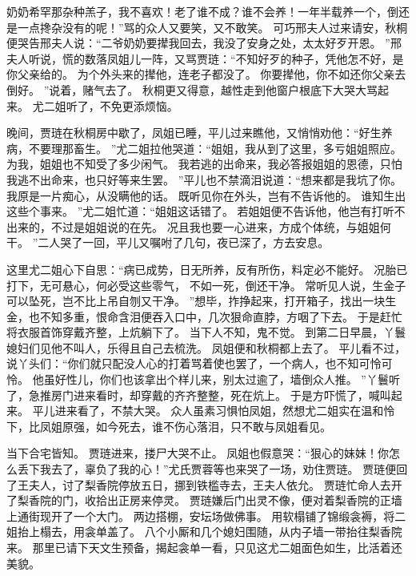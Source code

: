 奶奶希罕那杂种羔子，我不喜欢！老了谁不成？谁不会养！一年半载养一个，倒还是一点搀杂没有的呢！”骂的众人又要笑，又不敢笑。
可巧邢夫人过来请安，秋桐便哭告邢夫人说：“二爷奶奶要撵我回去，我没了安身之处，太太好歹开恩。
”邢夫人听说，慌的数落凤姐儿一阵，又骂贾琏：“不知好歹的种子，凭他怎不好，是你父亲给的。
为个外头来的撵他，连老子都没了。
你要撵他，你不如还你父亲去倒好。
”说着，赌气去了。
秋桐更又得意，越性走到他窗户根底下大哭大骂起来。
尤二姐听了，不免更添烦恼。
\par
晚间，贾琏在秋桐房中歇了，凤姐已睡，平儿过来瞧他，又悄悄劝他：“好生养病，不要理那畜生。
”尤二姐拉他哭道：“姐姐，我从到了这里，多亏姐姐照应。
为我，姐姐也不知受了多少闲气。
我若逃的出命来，我必答报姐姐的恩德，只怕我逃不出命来，也只好等来生罢。
”平儿也不禁滴泪说道：“想来都是我坑了你。
我原是一片痴心，从没瞒他的话。
既听见你在外头，岂有不告诉他的。
谁知生出这些个事来。
”尤二姐忙道：“姐姐这话错了。
若姐姐便不告诉他，他岂有打听不出来的，不过是姐姐说的在先。
况且我也要一心进来，方成个体统，与姐姐何干。
”二人哭了一回，平儿又嘱咐了几句，夜已深了，方去安息。
\par
这里尤二姐心下自思：“病已成势，日无所养，反有所伤，料定必不能好。
况胎已打下，无可悬心，何必受这些零气，
不如一死，倒还干净。
常听见人说，生金子可以坠死，岂不比上吊自刎又干净。
”想毕，拃挣起来，打开箱子，找出一块生金，也不知多重，恨命含泪便吞入口中，几次狠命直脖，方咽了下去。
于是赶忙将衣服首饰穿戴齐整，上炕躺下了。
当下人不知，鬼不觉。
到第二日早晨，丫鬟媳妇们见他不叫人，乐得且自己去梳洗。
凤姐便和秋桐都上去了。
平儿看不过，说丫头们：“你们就只配没人心的打着骂着使也罢了，一个病人，也不知可怜可怜。
他虽好性儿，你们也该拿出个样儿来，别太过逾了，墙倒众人推。
”丫鬟听了，急推房门进来看时，却穿戴的齐齐整整，死在炕上。
于是方吓慌了，喊叫起来。
平儿进来看了，不禁大哭。
众人虽素习惧怕凤姐，然想尤二姐实在温和怜下，比凤姐原强，如今死去，谁不伤心落泪，只不敢与凤姐看见。
\par
当下合宅皆知。
贾琏进来，搂尸大哭不止。
凤姐也假意哭：“狠心的妹妹！你怎么丢下我去了，辜负了我的心！”尤氏贾蓉等也来哭了一场，劝住贾琏。
贾琏便回了王夫人，讨了梨香院停放五日，挪到铁槛寺去，王夫人依允。
贾琏忙命人去开了梨香院的门，收拾出正房来停灵。
贾琏嫌后门出灵不像，便对着梨香院的正墙上通街现开了一个大门。
两边搭棚，安坛场做佛事。
用软榻铺了锦缎衾褥，将二姐抬上榻去，用衾单盖了。
八个小厮和几个媳妇围随，从内子墙一带抬往梨香院来。
那里已请下天文生预备，揭起衾单一看，只见这尤二姐面色如生，比活着还美貌。

